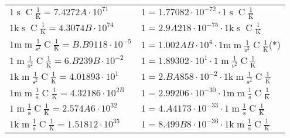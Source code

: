 \begin{center}
\begin{longtable}{l l}
{\color{black}$1 \bm{\mathrm{ }}{}{\operatorname{s}}{\operatorname{C}}\frac1{\operatorname{K}} = 7.4272A\cdot10^{71} $}   & {\color{black}$ 1 = 1.77082\cdot10^{-72} \cdot 1 \bm{\mathrm{ }}{}{\operatorname{s}}{\operatorname{C}}\frac1{\operatorname{K}}$}  \\
{\color{gray}$1 \bm{\mathrm{ k}}{}{\operatorname{s}}{\operatorname{C}}\frac1{\operatorname{K}} = 4.3074B\cdot10^{74} $}   & {\color{gray}$ 1 = 2.9A218\cdot10^{-75} \cdot 1 \bm{\mathrm{ k}}{}{\operatorname{s}}{\operatorname{C}}\frac1{\operatorname{K}}$}  \\
{\color{gray}$1 \bm{\mathrm{ m}}{\operatorname{m}}\frac1{\operatorname{s}^2}{\operatorname{C}}\frac1{\operatorname{K}} = B.B9118\cdot10^{-5} $}   & {\color{gray}$ 1 = 1.002AB\cdot10^{4} \cdot 1 \bm{\mathrm{ m}}{\operatorname{m}}\frac1{\operatorname{s}^2}{\operatorname{C}}\frac1{\operatorname{K}}$}\quad(*)\\
{\color{black}$1 \bm{\mathrm{ }}{\operatorname{m}}\frac1{\operatorname{s}^2}{\operatorname{C}}\frac1{\operatorname{K}} = 6.B239B\cdot10^{-2} $}   & {\color{black}$ 1 = 1.89302\cdot10^{1} \cdot 1 \bm{\mathrm{ }}{\operatorname{m}}\frac1{\operatorname{s}^2}{\operatorname{C}}\frac1{\operatorname{K}}$}  \\
{\color{gray}$1 \bm{\mathrm{ k}}{\operatorname{m}}\frac1{\operatorname{s}^2}{\operatorname{C}}\frac1{\operatorname{K}} = 4.01893\cdot10^{1} $}   & {\color{gray}$ 1 = 2.BA858\cdot10^{-2} \cdot 1 \bm{\mathrm{ k}}{\operatorname{m}}\frac1{\operatorname{s}^2}{\operatorname{C}}\frac1{\operatorname{K}}$}  \\
{\color{gray}$1 \bm{\mathrm{ m}}{\operatorname{m}}\frac1{\operatorname{s}}{\operatorname{C}}\frac1{\operatorname{K}} = 4.32186\cdot10^{2B} $}   & {\color{gray}$ 1 = 2.99206\cdot10^{-30} \cdot 1 \bm{\mathrm{ m}}{\operatorname{m}}\frac1{\operatorname{s}}{\operatorname{C}}\frac1{\operatorname{K}}$}  \\
{\color{black}$1 \bm{\mathrm{ }}{\operatorname{m}}\frac1{\operatorname{s}}{\operatorname{C}}\frac1{\operatorname{K}} = 2.574A6\cdot10^{32} $}   & {\color{black}$ 1 = 4.A4173\cdot10^{-33} \cdot 1 \bm{\mathrm{ }}{\operatorname{m}}\frac1{\operatorname{s}}{\operatorname{C}}\frac1{\operatorname{K}}$}  \\
{\color{gray}$1 \bm{\mathrm{ k}}{\operatorname{m}}\frac1{\operatorname{s}}{\operatorname{C}}\frac1{\operatorname{K}} = 1.51812\cdot10^{35} $}   & {\color{gray}$ 1 = 8.499B8\cdot10^{-36} \cdot 1 \bm{\mathrm{ k}}{\operatorname{m}}\frac1{\operatorname{s}}{\operatorname{C}}\frac1{\operatorname{K}}$}  \\

\end{longtable}
\end{center}
